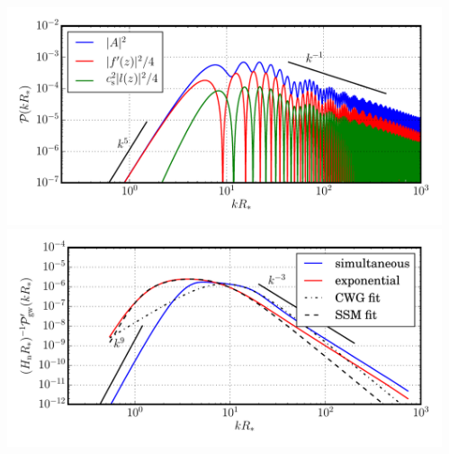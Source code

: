 \begin{frame}
\begin{columns}
\begin{column}{0.3\textwidth}
    \end{column}
    \begin{column}{0.4\textwidth}
        \includegraphics[width=\textwidth]{../fig/one_bub_vw0.44alpha0.05_nz5k_nx10k-final3}
        \includegraphics[width=\textwidth]{../fig/pow_gw_vw0.44alpha0.05_sim_1.0_exp_1.0_nz5k_nx10k_nT1000-final3}
    \end{column}
    \end{columns}
\end{frame}

